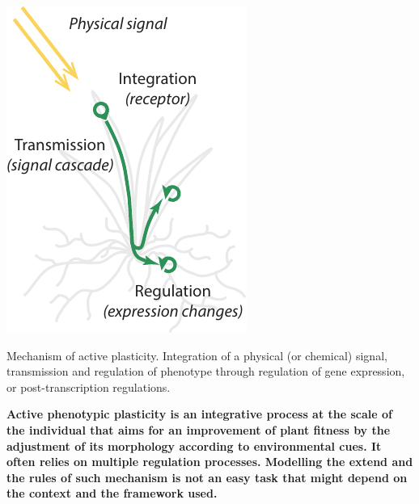 \begin{marginfigure}
    \includegraphics[width=1\linewidth]{./Figures/active_plasticity_m.pdf}
  \caption[Active plasticity]{Mechanism of active plasticity. Integration of a physical (or chemical) signal, transmission and regulation of phenotype through regulation of gene expression, or post-transcription regulations.}
  \label{fig:active_plasticity}
\end{marginfigure}

\textbf{Active phenotypic plasticity is an integrative process at the scale of the individual that aims for an improvement of plant fitness by the adjustment of its morphology according to environmental cues. It often relies on multiple regulation processes. Modelling the extend and the rules of such mechanism is not an easy task that might depend on the context and the framework used.}

